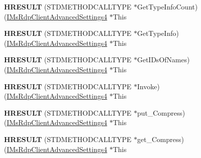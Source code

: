 \begin{DoxyCompactItemize}
{\bfseries H\+R\+E\+S\+U\+LT} (S\+T\+D\+M\+E\+T\+H\+O\+D\+C\+A\+L\+L\+T\+Y\+PE $\ast$Get\+Type\+Info\+Count)(\hyperlink{interface_m_s_t_s_c_lib_1_1_i_ms_rdp_client_advanced_settings4}{I\+Ms\+Rdp\+Client\+Advanced\+Settings4} $\ast$This
\item 
\mbox{\label{struct_m_s_t_s_c_lib_1_1_i_ms_rdp_client_advanced_settings4_vtbl_ad079358fa4eb159fde05cdccc94dc568}} 
{\bfseries H\+R\+E\+S\+U\+LT} (S\+T\+D\+M\+E\+T\+H\+O\+D\+C\+A\+L\+L\+T\+Y\+PE $\ast$Get\+Type\+Info)(\hyperlink{interface_m_s_t_s_c_lib_1_1_i_ms_rdp_client_advanced_settings4}{I\+Ms\+Rdp\+Client\+Advanced\+Settings4} $\ast$This
\item 
\mbox{\label{struct_m_s_t_s_c_lib_1_1_i_ms_rdp_client_advanced_settings4_vtbl_a234d2634930145f8ef63d00f0166b264}} 
{\bfseries H\+R\+E\+S\+U\+LT} (S\+T\+D\+M\+E\+T\+H\+O\+D\+C\+A\+L\+L\+T\+Y\+PE $\ast$Get\+I\+Ds\+Of\+Names)(\hyperlink{interface_m_s_t_s_c_lib_1_1_i_ms_rdp_client_advanced_settings4}{I\+Ms\+Rdp\+Client\+Advanced\+Settings4} $\ast$This
\item 
\mbox{\label{struct_m_s_t_s_c_lib_1_1_i_ms_rdp_client_advanced_settings4_vtbl_a11b2c56ceb948a60b70620d7b349e089}} 
{\bfseries H\+R\+E\+S\+U\+LT} (S\+T\+D\+M\+E\+T\+H\+O\+D\+C\+A\+L\+L\+T\+Y\+PE $\ast$Invoke)(\hyperlink{interface_m_s_t_s_c_lib_1_1_i_ms_rdp_client_advanced_settings4}{I\+Ms\+Rdp\+Client\+Advanced\+Settings4} $\ast$This
\item 
\mbox{\label{struct_m_s_t_s_c_lib_1_1_i_ms_rdp_client_advanced_settings4_vtbl_a67f4dce39fe72eae3b68fd117625d900}} 
{\bfseries H\+R\+E\+S\+U\+LT} (S\+T\+D\+M\+E\+T\+H\+O\+D\+C\+A\+L\+L\+T\+Y\+PE $\ast$put\+\_\+\+Compress)(\hyperlink{interface_m_s_t_s_c_lib_1_1_i_ms_rdp_client_advanced_settings4}{I\+Ms\+Rdp\+Client\+Advanced\+Settings4} $\ast$This
\item 
\mbox{\label{struct_m_s_t_s_c_lib_1_1_i_ms_rdp_client_advanced_settings4_vtbl_a64a00c52b7200a5e8d7e4c117ab184b3}} 
{\bfseries H\+R\+E\+S\+U\+LT} (S\+T\+D\+M\+E\+T\+H\+O\+D\+C\+A\+L\+L\+T\+Y\+PE $\ast$get\+\_\+\+Compress)(\hyperlink{interface_m_s_t_s_c_lib_1_1_i_ms_rdp_client_advanced_settings4}{I\+Ms\+Rdp\+Client\+Advanced\+Settings4} $\ast$This

\end{DoxyCompactItemize}
